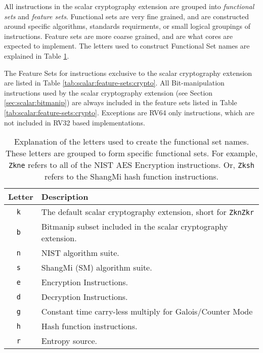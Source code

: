 
All instructions in the scalar cryptography extension are grouped into
{\em functional sets} and {\em feature sets}.
Functional sets are very fine grained, and are constructed around
specific algorithms, standards requirments, or small logical groupings
of instructions.
Feature sets are more coarse grained, and are what cores are expected
to implement.
The letters used to construct Functional Set names are explained in
Table \ref{tab:scalar:functional-sets}.

The Feature Sets for instructions exclusive to the scalar cryptography
extension are listed in
Table \ref{tab:scalar:feature-sets:crypto}.
All Bit-manipulation instructions used by the scalar cryptography extension
(see Section \ref{sec:scalar:bitmanip})
are always included in the feature sets listed in
Table \ref{tab:scalar:feature-sets:crypto}.
Exceptions are RV64 only instructions, which are not included in RV32
based implementations.

\begin{table}[h]
\centering
\begin{tabular}{cl}
Letter   & Description \\
\hline
{\tt k } & The default scalar cryptography extension, short for {\tt ZknZkr}    \\
{\tt b } & Bitmanip subset included in the scalar cryptography extension.       \\
{\tt n } & NIST algorithm suite.                                                \\
{\tt s } & ShangMi (SM) algorithm suite.                                        \\
{\tt e } & Encryption Instructions.                                             \\
{\tt d } & Decryption Instructions.                                             \\
{\tt g } & Constant time carry-less multiply for Galois/Counter Mode            \\
{\tt h } & Hash function instructions.                                          \\
{\tt r } & Entropy source.                                                      \\
\hline
\end{tabular}
\caption{
    Explanation of the letters used to create the functional set names.
    These letters are grouped to form specific functional sets.
    For example, {\tt Zkne} refers to all of the NIST AES Encryption
    instructions. Or, {\tt Zksh} refers to the ShangMi hash function instructions.
}
\label{tab:scalar:functional-sets}
\end{table}

